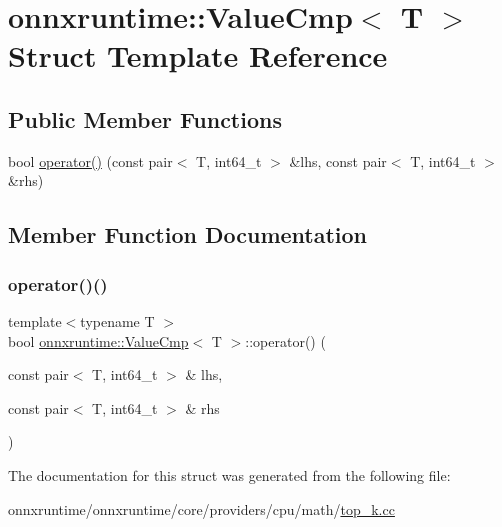 \hypertarget{structonnxruntime_1_1ValueCmp}{}\section{onnxruntime\+:\+:Value\+Cmp$<$ T $>$ Struct Template Reference}
\label{structonnxruntime_1_1ValueCmp}
\subsection*{Public Member Functions}
\begin{DoxyCompactItemize}
\item 
bool \mbox{\hyperlink{structonnxruntime_1_1ValueCmp_a89b8a8e28774b21b13c606cb2978f20e}{operator()}} (const pair$<$ T, int64\+\_\+t $>$ \&lhs, const pair$<$ T, int64\+\_\+t $>$ \&rhs)
\end{DoxyCompactItemize}


\subsection{Member Function Documentation}
\mbox{\label{structonnxruntime_1_1ValueCmp_a89b8a8e28774b21b13c606cb2978f20e}} 
\subsubsection{\texorpdfstring{operator()()}{operator()()}}
{\footnotesize\ttfamily template$<$typename T $>$ \\
bool \mbox{\hyperlink{structonnxruntime_1_1ValueCmp}{onnxruntime\+::\+Value\+Cmp}}$<$ T $>$\+::operator() (\begin{DoxyParamCaption}\item[{const pair$<$ T, int64\+\_\+t $>$ \&}]{lhs,  }\item[{const pair$<$ T, int64\+\_\+t $>$ \&}]{rhs }\end{DoxyParamCaption})\hspace{0.3cm}{\ttfamily [inline]}}



The documentation for this struct was generated from the following file\+:\begin{DoxyCompactItemize}
\item 
onnxruntime/onnxruntime/core/providers/cpu/math/\mbox{\hyperlink{top__k_8cc}{top\+\_\+k.\+cc}}\end{DoxyCompactItemize}
